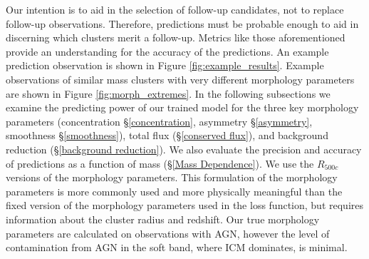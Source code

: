 \documentclass[twocolumn, 11pt]{aastex63}%
\begin{document}
Our intention is to aid in the selection of follow-up candidates, not to replace follow-up observations. Therefore, predictions must be probable enough to aid in discerning which clusters merit a follow-up. Metrics like those aforementioned provide an understanding for the accuracy of the predictions. An example prediction observation is shown in Figure \ref{fig:example_results}. Example observations of similar mass clusters with very different morphology parameters are shown in Figure \ref{fig:morph_extremes}. In the following subsections we examine the predicting power of our trained model for the three key morphology parameters (concentration \S\ref{concentration}, asymmetry \S\ref{asymmetry}, smoothness \S\ref{smoothness}), total flux (\S\ref{conserved flux}), and background reduction (\S\ref{background reduction}). We also evaluate the precision and accuracy of predictions as a function of mass (\S\ref{Mass Dependence}). We use the $R_{500c}$ versions of the morphology parameters. This formulation of the morphology parameters is more commonly used and more physically meaningful than the fixed version of the morphology parameters used in the loss function, but requires information about the cluster radius and redshift. Our true morphology parameters are calculated on observations with AGN, however the level of contamination from AGN in the soft band, where ICM dominates, is minimal.
\end{document}
